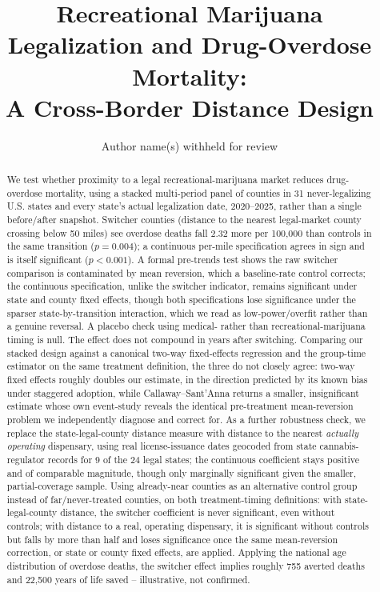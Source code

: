 \documentclass[preprint,12pt,authoryear]{elsarticle}
\begin{document}
\begin{frontmatter}

\title{Recreational Marijuana Legalization and Drug-Overdose Mortality:\\
A Cross-Border Distance Design}

\author{Author name(s) withheld for review}

\begin{abstract}
\noindent We test whether proximity to a legal recreational-marijuana
market reduces drug-overdose mortality, using a stacked multi-period
panel of counties in 31 never-legalizing U.S. states and every state's
actual legalization date, 2020--2025, rather than a single
before/after snapshot. Switcher counties (distance to the nearest
legal-market county crossing below 50 miles) see overdose deaths fall
2.32 more per 100,000 than controls in the same transition
($p=0.004$); a continuous per-mile specification agrees in sign and is
itself significant ($p<0.001$). A formal pre-trends test shows the raw
switcher comparison is contaminated by mean reversion, which a
baseline-rate control corrects; the continuous specification, unlike
the switcher indicator, remains significant under state and county
fixed effects, though both specifications lose significance under the
sparser state-by-transition interaction, which we read as
low-power/overfit rather than a genuine reversal. A placebo check using
medical- rather than recreational-marijuana timing is null. The effect
does not compound in years after switching. Comparing our stacked
design against a canonical two-way fixed-effects regression and the
\citet{CallawaySantAnna2021} group-time estimator on the same
treatment definition, the three do not closely agree: two-way fixed
effects roughly doubles our estimate, in the direction predicted by
its known bias under staggered adoption, while Callaway--Sant'Anna
returns a smaller, insignificant estimate whose own event-study
reveals the identical pre-treatment mean-reversion problem we
independently diagnose and correct for. As a further robustness
check, we replace the state-legal-county distance measure with
distance to the nearest \emph{actually operating} dispensary, using
real license-issuance dates geocoded from state cannabis-regulator
records for 9 of the 24 legal states; the continuous coefficient stays
positive and of comparable magnitude, though only marginally
significant given the smaller, partial-coverage sample. Using
already-near counties as an alternative control group instead of
far/never-treated counties, on both treatment-timing definitions: with
state-legal-county distance, the switcher coefficient is never
significant, even without controls; with distance to a real, operating
dispensary, it is significant without controls but falls by more than
half and loses significance once the same mean-reversion correction,
or state or county fixed effects, are applied. Applying the national
age distribution of
overdose deaths, the switcher effect implies roughly 755 averted deaths
and 22,500 years of life saved -- illustrative, not confirmed.
\end{abstract}


\end{frontmatter}
\end{document}
